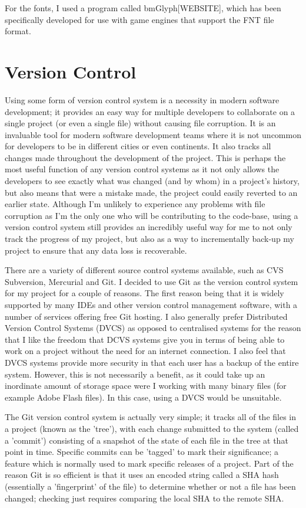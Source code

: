 \documentclass[a4paper,oneside]{report}
\begin{document}
For the fonts, I used a program called bmGlyph[WEBSITE], which has been specifically developed for use with game engines that support the FNT file format.

\section{Version Control}

Using some form of version control system is a necessity in modern software development; it provides an easy way for multiple developers to collaborate on a single project (or even a single file) without causing file corruption. It is an invaluable tool for modern software development teams where it is not uncommon for developers to be in different cities or even continents. It also tracks all changes made throughout the development of the project. This is perhaps the most useful function of any version control systems as it not only allows the developers to see exactly what was changed (and by whom) in a project's history, but also means that were a mistake made, the project could easily reverted to an earlier state. Although I'm unlikely to experience any problems with file corruption as I'm the only one who will be contributing to the code-base, using a version control system still provides an incredibly useful way for me to not only track the progress of my project, but also as a way to incrementally back-up my project to ensure that any data loss is recoverable.

There are a variety of different source control systems available, such as CVS Subversion, Mercurial and Git. I decided to use Git as the version control system for my project for a couple of reasons. The first reason being that it is widely supported by many IDEs and other version control management software, with a number of services offering free Git hosting. I also generally prefer Distributed Version Control Systems (DVCS) as opposed to centralised systems for the reason that I like the freedom that DCVS systems give you in terms of being able to work on a project without the need for an internet connection. I also feel that DVCS systems provide more security in that each user has a backup of the entire system. However, this is not necessarily a benefit, as it could take up an inordinate amount of storage space were I working with many binary files (for example Adobe Flash files). In this case, using a DVCS would be unsuitable.

The Git version control system is actually very simple; it tracks all of the files in a project (known as the 'tree'), with each change submitted to the system (called a 'commit') consisting of a snapshot of the state of each file in the tree at that point in time. Specific commits can be 'tagged' to mark their significance; a feature which is normally used to mark specific releases of a project. Part of the reason Git is so efficient is that it uses an encoded string called a SHA hash (essentially a 'fingerprint' of the file) to determine whether or not a file has been changed; checking just requires comparing the local SHA to the remote SHA. 
\end{document}
